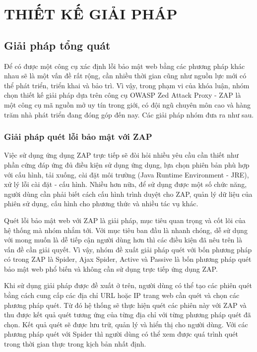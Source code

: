 \chapter{THIẾT KẾ GIẢI PHÁP}

\section{Giải pháp tổng quát} \label{sec:AbstractSol}

\tab Để có được một công cụ xác định lỗi bảo mật web bằng các phương pháp khác nhau sẽ là một vấn đề rất rộng, cần nhiều thời gian cũng như nguồn lực mới có thể phát triển, triển khai và bảo trì.
Vì vậy, trong phạm vi của khóa luận, nhóm chọn thiết kế giải pháp dựa trên công cụ OWASP Zed Attack Proxy - ZAP là một công cụ mã nguồn mở uy tín trong giới, có đội ngũ chuyên môn cao và hàng trăm nhà phát triển đang đóng góp đến nay.
Các giải pháp nhóm đưa ra như sau.

\subsection{Giải pháp quét lỗi bảo mật với ZAP}

\tab Việc sử dụng ứng dụng ZAP trực tiếp sẽ đòi hỏi nhiều yêu cầu cần thiết như phần cứng đáp ứng đủ điều kiện sử dụng ứng dụng, lựa chọn phiên bản phù hợp với cấu hình, tải xuống, cài đặt môi trường (Java Runtime Environment - JRE), xử lý lỗi cài đặt - cấu hình.
Nhiều hơn nữa, để sử dụng được một số chức năng, người dùng cần phải biết cách cấu hình trình duyệt cho ZAP, quản lý dữ liệu của phiên sử dụng, cấu hình cho phương thức và nhiều tác vụ khác.

Quét lỗi bảo mật web với ZAP là giải pháp, mục tiêu quan trọng và cốt lõi của hệ thống mà nhóm nhắm tới.
Với mục tiêu ban đầu là nhanh chóng, dễ sử dụng với mong muốn là dễ tiếp cận người dùng hơn thì các điều kiện đã nêu trên là vấn đề cần giải quyết.
Vì vậy, nhóm đề xuất giải pháp quét với bốn phương pháp có trong ZAP là Spider, Ajax Spider, Active và Passive là bốn phương pháp quét bảo mật web phổ biến và không cần sử dụng trực tiếp ứng dụng ZAP.

Khi sử dụng giải pháp được đề xuất ở trên, người dùng có thể tạo các phiên quét bằng cách cung cấp các địa chỉ URL hoặc IP trang web cần quét và chọn các phương pháp quét.
Từ đó hệ thống sẽ thực hiện quét các phiên này với ZAP và thu được kết quả quét tương ứng của từng địa chỉ với từng phương pháp quét đã chọn.
Kết quả quét sẽ được lưu trữ, quản lý và hiển thị cho người dùng.
Với các phương pháp quét với Spider thì người dùng có thể xem được quá trình quét trong thời gian thực trong kịch bản nhất định.

